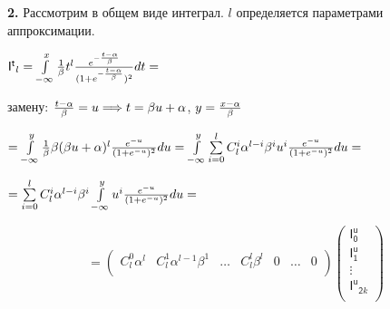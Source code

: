 \documentclass[a4paper,12pt]{article}
\begin{document}
\noindent\textbf{2.} Рассмотрим в общем виде интеграл. $l$ определяется параметрами аппроксимации.

\begin{center}
    $\mathsf{I^t}_l = \int\limits_{-\infty}^x {1\over{\beta}} t^l {e^{-{t - \alpha\over{\beta}}}\over{(1 + e^{-{t - \alpha\over{\beta}}}})^2} d t = $
\end{center}

 замену: ${t - \alpha\over{\beta}} = u \Longrightarrow t = \beta u + \alpha$, $y = {x - \alpha\over{\beta}}$

\begin{center}
    $= \int\limits_{-\infty}^y {1\over{\beta}} \beta (\beta u + \alpha)^l {e^{-u}\over{(1 + e^{-u}})^2} d u = \int\limits_{-\infty}^y \sum\limits_{i = 0}^l C_l^i \alpha^{l - i} \beta^i u^i {e^{-u}\over{(1 + e^{-u}})^2} d u = $
\end{center}

\begin{center}
    $= \sum\limits_{i = 0}^l C_l^i \alpha^{l - i} \beta^{i}  \int\limits_{-\infty}^y u^i {e^{-u}\over{(1 + e^{-u}})^2} d u =$
\end{center}

\begin{displaymath}
    = \begin{pmatrix}
        C_l^0 \alpha^l & C_l^1 \alpha^{l - 1} \beta^1 & \ldots & C_l^l \beta^{l} & 0 & \ldots & 0 \\
    \end{pmatrix} \begin{pmatrix}
        \mathsf{I^u_0} \\ \mathsf{I^u_1} \\ \vdots \\ \mathsf{I^u}_{\mathsf{2}k} \\
    \end{pmatrix}
\end{displaymath}

\end{document}
